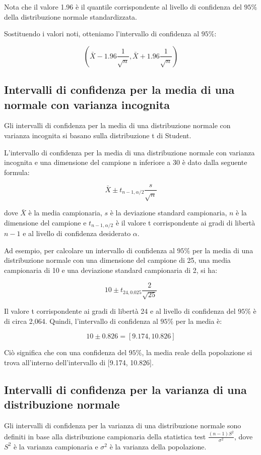 Nota che il valore 1.96 è il quantile corrispondente al livello di confidenza del $95\%$ della distribuzione normale standardizzata.

Sostituendo i valori noti, otteniamo l'intervallo di confidenza al $95\%$:

$$(\bar{X}-1.96\frac{1}{\sqrt{n}},\bar{X}+1.96\frac{1}{\sqrt{n}})$$

\subsection{Intervalli di confidenza per la media di una normale con varianza incognita}
Gli intervalli di confidenza per la media di una distribuzione normale con varianza incognita si basano sulla distribuzione t di Student.

L'intervallo di confidenza per la media di una distribuzione normale con varianza incognita e una dimensione del campione n inferiore a 30 è dato dalla seguente formula:

$$
\bar{X} \pm t_{n-1,\alpha/2}\frac{s}{\sqrt{n}}
$$

dove $\bar{X}$ è la media campionaria, $s$ è la deviazione standard campionaria, $n$ è la dimensione del campione e $t_{n-1,\alpha/2}$ è il valore t corrispondente ai gradi di libertà $n-1$ e al livello di confidenza desiderato $\alpha$.

Ad esempio, per calcolare un intervallo di confidenza al $95\%$ per la media di una distribuzione normale con una dimensione del campione di 25, una media campionaria di 10 e una deviazione standard campionaria di 2, si ha:

$$
10 \pm t_{24,0.025}\frac{2}{\sqrt{25}}
$$

Il valore t corrispondente ai gradi di libertà 24 e al livello di confidenza del $95\%$ è di circa 2,064. Quindi, l'intervallo di confidenza al $95\%$ per la media è:

$$
10 \pm 0.826 = [9.174, 10.826]
$$

Ciò significa che con una confidenza del $95\%$, la media reale della popolazione si trova all'interno dell'intervallo di [9.174, 10.826].


\subsection{Intervalli di confidenza per la varianza di una distribuzione normale}


Gli intervalli di confidenza per la varianza di una distribuzione normale sono definiti in base alla distribuzione campionaria della statistica test $\frac{(n-1)S^2}{\sigma^2}$, dove $S^2$ è la varianza campionaria e $\sigma^2$ è la varianza della popolazione.

